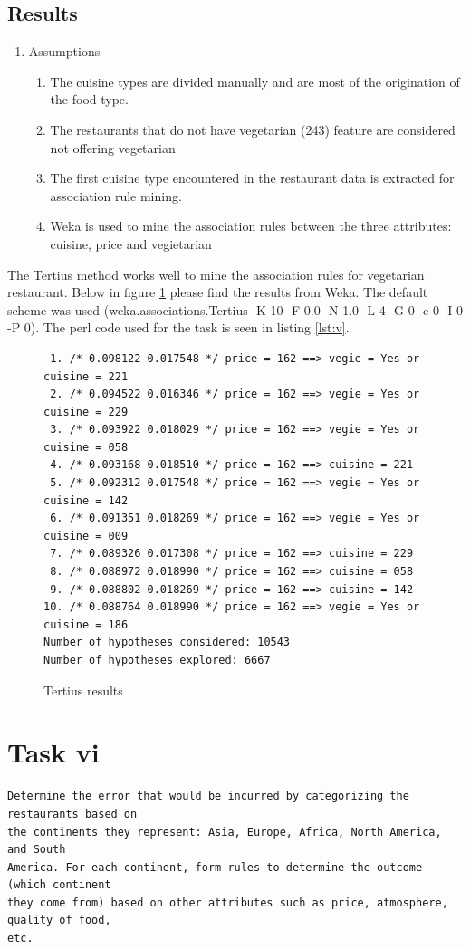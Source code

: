 \documentclass[letterpaper,10pt]{article}
\begin{document}
\subsection*{Results}
\begin{enumerate}
\item Assumptions 
\begin{enumerate}
\item The cuisine types are divided manually and are most of the origination of the food type.
\item The restaurants that do not have vegetarian (243) feature are considered not offering vegetarian
\item The first cuisine type encountered in the restaurant data is extracted for association rule mining.
\item Weka is used to mine the association rules between the three attributes: cuisine, price and vegietarian
\end{enumerate} 
\end{enumerate}
The Tertius method works well to mine the association rules for vegetarian restaurant. Below in figure \hyperref[fig:tv]{\ref{fig:tv}} please find the results from Weka. The default scheme was used (weka.associations.Tertius -K 10 -F 0.0 -N 1.0 -L 4 -G 0 -c 0 -I 0 -P 0). The perl code used for the task is seen in listing \hyperref[lst:v]{\ref{lst:v}}.
\begin{figure}[h]
\begin{verbatim}
 1. /* 0.098122 0.017548 */ price = 162 ==> vegie = Yes or cuisine = 221
 2. /* 0.094522 0.016346 */ price = 162 ==> vegie = Yes or cuisine = 229
 3. /* 0.093922 0.018029 */ price = 162 ==> vegie = Yes or cuisine = 058
 4. /* 0.093168 0.018510 */ price = 162 ==> cuisine = 221
 5. /* 0.092312 0.017548 */ price = 162 ==> vegie = Yes or cuisine = 142
 6. /* 0.091351 0.018269 */ price = 162 ==> vegie = Yes or cuisine = 009
 7. /* 0.089326 0.017308 */ price = 162 ==> cuisine = 229
 8. /* 0.088972 0.018990 */ price = 162 ==> cuisine = 058
 9. /* 0.088802 0.018269 */ price = 162 ==> cuisine = 142
10. /* 0.088764 0.018990 */ price = 162 ==> vegie = Yes or cuisine = 186 
Number of hypotheses considered: 10543
Number of hypotheses explored: 6667
\end{verbatim}
\caption{Tertius results}
 \label{fig:tv} 
\end{figure}

\section*{Task vi}
\begin{verbatim}
Determine the error that would be incurred by categorizing the restaurants based on
the continents they represent: Asia, Europe, Africa, North America, and South
America. For each continent, form rules to determine the outcome (which continent
they come from) based on other attributes such as price, atmosphere, quality of food,
etc.
\end{verbatim}
\end{document}

